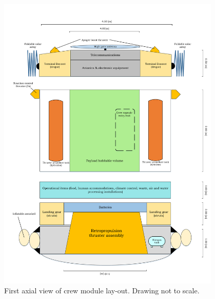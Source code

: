 \begin{figure}[ht]
		\centering
		\includegraphics[width=0.95\textwidth]{./Figure/CrewModule/Axialview.pdf}
		\caption[First axial view of crew module lay-out]{First axial view of crew module lay-out. Drawing not to scale.}
		\label{fig:axview}
\end{figure}

